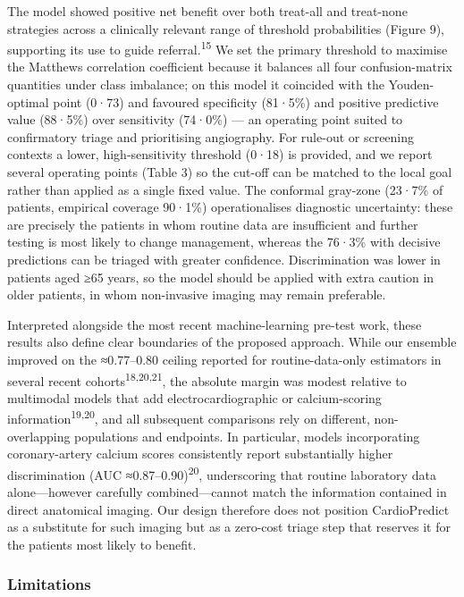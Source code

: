 \documentclass[
  english,
  11pt,
]{article}
\newcounter{none} %
\begin{document}
The model showed positive net benefit over both treat-all and treat-none
strategies across a clinically relevant range of threshold probabilities
(Figure 9), supporting its use to guide referral.\textsuperscript{15} We set the primary
threshold to maximise the Matthews correlation coefficient because it
balances all four confusion-matrix quantities under class imbalance; on
this model it coincided with the Youden-optimal point (0·73) and
favoured specificity (81·5\%) and positive predictive value (88·5\%)
over sensitivity (74·0\%) --- an operating point suited to confirmatory
triage and prioritising angiography. For rule-out or screening contexts
a lower, high-sensitivity threshold (0·18) is provided, and we report
several operating points (Table 3) so the cut-off can be matched to the
local goal rather than applied as a single fixed value. The conformal
gray-zone (23·7\% of patients, empirical coverage 90·1\%)
operationalises diagnostic uncertainty: these are precisely the patients
in whom routine data are insufficient and further testing is most likely
to change management, whereas the 76·3\% with decisive predictions can
be triaged with greater confidence. Discrimination was lower in patients
aged ≥65 years, so the model should be applied with extra caution in
older patients, in whom non-invasive imaging may remain preferable.

Interpreted alongside the most recent machine-learning pre-test work,
these results also define clear boundaries of the proposed approach.
While our ensemble improved on the ≈0.77--0.80 ceiling reported for
routine-data-only estimators in several recent cohorts\textsuperscript{18,20,21},
the absolute margin was modest relative to multimodal models that add
electrocardiographic or calcium-scoring information\textsuperscript{19,20}, and all
subsequent comparisons rely on different, non-overlapping populations
and endpoints. In particular, models incorporating coronary-artery
calcium scores consistently report substantially higher discrimination
(AUC ≈0.87--0.90)\textsuperscript{20}, underscoring that routine laboratory data
alone---however carefully combined---cannot match the information
contained in direct anatomical imaging. Our design therefore does not
position CardioPredict as a substitute for such imaging but as a
zero-cost triage step that reserves it for the patients most likely to
benefit.

\subsubsection{Limitations}\label{limitations}
\end{document}
